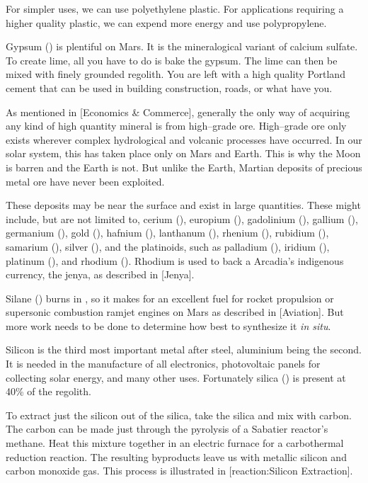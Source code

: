 For simpler uses, we can use polyethylene plastic. For applications requiring a higher quality plastic, we can expend more energy and use polypropylene.

Gypsum () is plentiful on Mars. It is the mineralogical variant of calcium sulfate. To create lime, all you have to do is bake the gypsum. The lime can then be mixed with finely grounded regolith. You are left with a high quality Portland cement that can be used in building construction, roads, or what have you.

As mentioned in [Economics & Commerce], generally the only way of acquiring any kind of high quantity mineral is from high--grade ore. High--grade ore only exists wherever complex hydrological and volcanic processes have occurred. In our solar system, this has taken place only on Mars and Earth. This is why the Moon is barren and the Earth is not. But unlike the Earth, Martian deposits of precious metal ore have never been exploited.

These deposits may be near the surface and exist in large quantities. These might include, but are not limited to, cerium (), europium (), gadolinium (), gallium (), germanium (), gold (), hafnium (), lanthanum (), rhenium (), rubidium (), samarium (), silver (), and the platinoids, such as palladium (), iridium (), platinum (), and rhodium (). Rhodium is used to back a Arcadia's indigenous currency, the jenya, as described in [Jenya].

Silane () burns in , so it makes for an excellent fuel for rocket propulsion or supersonic combustion ramjet engines on Mars as described in [Aviation]. But more work needs to be done to determine how best to synthesize it {\it in situ}.

Silicon is the third most important metal after steel, aluminium being the second. It is needed in the manufacture of all electronics, photovoltaic panels for collecting solar energy, and many other uses. Fortunately silica () is present at 40\% of the regolith.

To extract just the silicon out of the silica, take the silica and mix with carbon. The carbon can be made just through the pyrolysis of a Sabatier reactor's methane. Heat this mixture together in an electric furnace for a carbothermal reduction reaction. The resulting byproducts leave us with metallic silicon and carbon monoxide gas. This process is illustrated in [reaction:Silicon Extraction]. 

